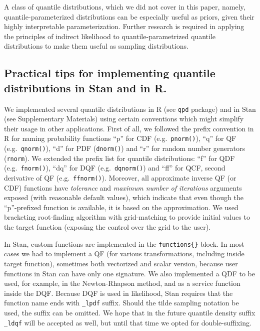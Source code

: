 \documentclass[
  12pt,
]{article}
\begin{document}
A class of quantile distributions, which we did not cover in this paper, namely, quantile-parameterized distributions \citep{keelin2011QuantileParameterizedDistributions, hadlock2017JohnsonQuantileParameterizedDistributions, keelin2016MetalogDistributions} can be especially useful as priors, given their highly interpretable parameterization. Further research is required in applying the principles of indirect likelihood to quantile-parametrized quantile distributions to make them useful as sampling distributions.

\hypertarget{practical-tips-for-implementing-quantile-distributions-in-stan-and-in-r.}{%
\subsection{Practical tips for implementing quantile distributions in Stan and in R.}\label{practical-tips-for-implementing-quantile-distributions-in-stan-and-in-r.}}

We implemented several quantile distributions in R (see \texttt{qpd} package) and in Stan (see Supplementary Materials) using certain conventions which might simplify their usage in other applications. First of all, we followed the prefix convention in R for naming probability functions ``p'' for CDF (e.g.~\texttt{pnorm()}), ``q'' for QF (e.g.~\texttt{qnorm()}), ``d'' for PDF (\texttt{dnorm()}) and ``r'' for random number generators (\texttt{rnorm}). We extended the prefix list for quantile distributions: ``f'' for QDF (e.g.~\texttt{fnorm()}), ``dq'' for DQF (e.g.~\texttt{dqnorm()}) and ``ff'' for QCF, second derivative of QF (e.g.~\texttt{ffnorm()}). Moreover, all approximate inverse QF (or CDF) functions have \emph{tolerance} and \emph{maximum number of iterations} arguments exposed (with reasonable default values), which indicate that even though the ``p''-prefixed function is available, it is based on the approximation. We used bracketing root-finding algorithm with grid-matching to provide initial values to the target function (exposing the control over the grid to the user).

In Stan, custom functions are implemented in the \texttt{functions\{\}} block. In most cases we had to implement a QF (for various transformations, including inside target function), sometimes both vectorized and scalar version, because user functions in Stan can have only one signature. We also implemented a QDF to be used, for example, in the Newton-Rhapson method, and as a service function inside the DQF. Because DQF is used in likelihood, Stan requires that the function name ends with \texttt{\_lpdf} suffix. Should the tilde sampling notation be used, the suffix can be omitted. We hope that in the future quantile density suffix \texttt{\_ldqf} will be accepted as well, but until that time we opted for double-suffixing.
\end{document}
